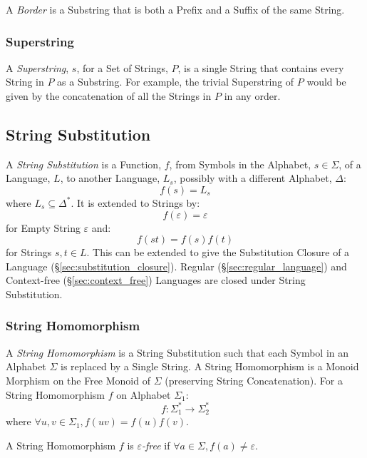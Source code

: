 A \emph{Border} is a Substring that is both a Prefix and a Suffix of the same
String.



\subsubsection{Superstring}\label{sec:superstring}

A \emph{Superstring}, $s$, for a Set of Strings, $P$, is a single String that
contains every String in $P$ as a Substring. For example, the trivial
Superstring of $P$ would be given by the concatenation of all the Strings in $P$
in any order.



\subsection{String Substitution}\label{sec:string_substitution}

A \emph{String Substitution} is a Function, $f$, from Symbols in the Alphabet,
$s \in \Sigma$, of a Language, $L$, to another Language, $L_s$, possibly with a
different Alphabet, $\Delta$:
\[
  f(s) = L_s
\]
where $L_s \subseteq \Delta^*$. It is extended to Strings by:
\[
  f(\varepsilon) = \varepsilon
\]
for Empty String $\varepsilon$ and:
\[
  f(st) = f(s)f(t)
\]
for Strings $s,t \in L$. This can be extended to give the Substitution Closure
of a Language (\S\ref{sec:substitution_closure}). Regular
(\S\ref{sec:regular_language}) and Context-free (\S\ref{sec:context_free})
Languages are closed under String Substitution.



\subsubsection{String Homomorphism}\label{sec:string_homomorphism}

A \emph{String Homomorphism} is a String Substitution such that each Symbol in
an Alphabet $\Sigma$ is replaced by a Single String. A String Homomorphism is a
Monoid Morphism on the Free Monoid of $\Sigma$ (preserving String
Concatenation). For a String Homomorphism $f$ on Alphabet $\Sigma_1$:
\[
  f : \Sigma_1^* \rightarrow \Sigma_2^*
\]
where $\forall u,v \in \Sigma_1, f(uv) = f(u)f(v)$.

A String Homomorphism $f$ is \emph{$\varepsilon$-free} if $\forall a
\in \Sigma, f(a) \neq \varepsilon$.

